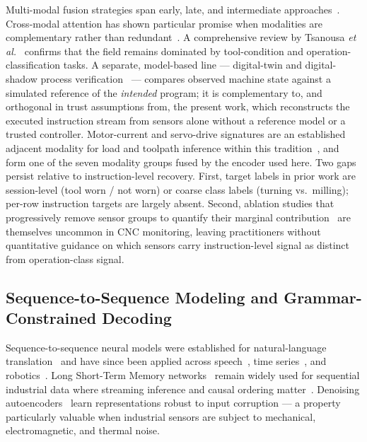 \documentclass[sensors,article,submit,moreauthors,pdftex]{Definitions/mdpi}
\newcommand{\etal}{\textit{et al.}}
\begin{document}
Multi-modal fusion strategies span early, late, and intermediate approaches~\cite{lahat2015multimodal,ramachandram2017deep}. Cross-modal attention has shown particular promise when modalities are complementary rather than redundant~\cite{cao2023crossattention,wang2024multisensor}. A comprehensive review by Tsanousa \etal~\cite{tsanousa2022multisensor} confirms that the field remains dominated by tool-condition and operation-classification tasks. A separate, model-based line --- digital-twin and digital-shadow process verification~\cite{bergs2021digital} --- compares observed machine state against a simulated reference of the \emph{intended} program; it is complementary to, and orthogonal in trust assumptions from, the present work, which reconstructs the executed instruction stream from sensors alone without a reference model or a trusted controller. Motor-current and servo-drive signatures are an established adjacent modality for load and toolpath inference within this tradition~\cite{teti2010advanced,wang2018deep}, and form one of the seven modality groups fused by the encoder used here. Two gaps persist relative to instruction-level recovery. First, target labels in prior work are session-level (tool worn / not worn) or coarse class labels (turning vs.\ milling); per-row instruction targets are largely absent. Second, ablation studies that progressively remove sensor groups to quantify their marginal contribution~\cite{meyes2019ablation,jia2016deep} are themselves uncommon in CNC monitoring, leaving practitioners without quantitative guidance on which sensors carry instruction-level signal as distinct from operation-class signal.

\subsection{Sequence-to-Sequence Modeling and Grammar-Constrained Decoding}
\label{sec:related-seq2seq}

Sequence-to-sequence neural models were established for natural-language translation~\cite{sutskever2014sequence,bahdanau2014neural,vaswani2017attention} and have since been applied across speech~\cite{graves2013speech}, time series~\cite{wen2023transformers}, and robotics~\cite{robotics_s2s}. Long Short-Term Memory networks~\cite{hochreiter1997long} remain widely used for sequential industrial data where streaming inference and causal ordering matter~\cite{malhotra2015lstm}. Denoising autoencoders~\cite{vincent2010stacked} learn representations robust to input corruption --- a property particularly valuable when industrial sensors are subject to mechanical, electromagnetic, and thermal noise.
\end{document}
